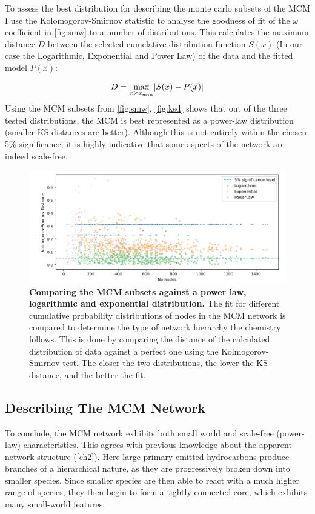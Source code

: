 To assess the best distribution for describing the monte carlo subsets of the MCM I use the Kolomogorov-Smirnov statistic \citep{ks} to analyse the goodness of fit of the $\omega$ coefficient in \autoref{fig:smw} to a number of distributions. This calculates the maximum distance $D$ between the selected cumelative distribution function $S(x)$ (In our case the Logarithmic, Exponential and Power Law) of the data and the fitted model $P(x)$:

\begin{equation}
D = \smash{\displaystyle\max_{x \ge x_{min}}} |{S(x) - P(x)}|
\end{equation}

Using the MCM subsets from \autoref{fig:smw}, \autoref{fig:ksd} shows that out of the three tested distributions, the MCM is best represented as a power-law distribution (smaller KS distances are better). Although this is not entirely within the chosen 5\% significance, it is highly indicative that some aspects of the network are indeed scale-free.

\begin{figure}[H]
     \centering
         \includegraphics[width=\textwidth]{figures_c3/KSdistance.png}
        \caption{\textbf{Comparing the MCM subsets against a power law, logarithmic and exponential distribution.} The fit for different cumulative probability distributions of nodes in the MCM network is compared to determine the type of network hierarchy the chemistry follows. This is done by comparing the distance of the calculated distribution of data against a perfect one using the Kolmogorov-Smirnov test. The closer the two distributions, the lower the KS distance, and the better the fit. }
        \label{fig:ksd}
\end{figure}

\subsection{Describing The MCM Network}
To conclude, the MCM network exhibits both small world and scale-free (power-law) characteristics. This agrees with previous knowledge about the apparent network structure (\autoref{ch2}). Here large primary emitted hydrocarbons produce branches of a hierarchical nature, as they are progressively broken down into smaller species. Since smaller species are then able to react with a much higher range of species, they then begin to form a tightly connected core, which exhibits many small-world features.

